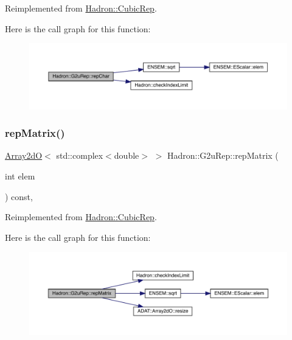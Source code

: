 Reimplemented from \mbox{\hyperlink{structHadron_1_1CubicRep_af45227106e8e715e84b0af69cd3b36f8}{Hadron\+::\+Cubic\+Rep}}.

Here is the call graph for this function\+:
\nopagebreak
\begin{figure}[H]
\begin{center}
\leavevmode
\includegraphics[width=350pt]{dc/dc0/structHadron_1_1G2uRep_a51ea6b7795e07c824b72dbefb7fb6ddb_cgraph}
\end{center}
\end{figure}
\mbox{\label{structHadron_1_1G2uRep_ac35dd43af2c4b6f32d9d3511b2500230}} 
\subsubsection{\texorpdfstring{repMatrix()}{repMatrix()}\hspace{0.1cm}{\footnotesize\ttfamily [1/3]}}
{\footnotesize\ttfamily \mbox{\hyperlink{classADAT_1_1Array2dO}{Array2dO}}$<$ std\+::complex$<$double$>$ $>$ Hadron\+::\+G2u\+Rep\+::rep\+Matrix (\begin{DoxyParamCaption}\item[{int}]{elem }\end{DoxyParamCaption}) const\hspace{0.3cm}{\ttfamily [inline]}, {\ttfamily [virtual]}}



Reimplemented from \mbox{\hyperlink{structHadron_1_1CubicRep_ac5d7e9e6f4ab1158b5fce3e4ad9e8005}{Hadron\+::\+Cubic\+Rep}}.

Here is the call graph for this function\+:
\nopagebreak
\begin{figure}[H]
\begin{center}
\leavevmode
\includegraphics[width=350pt]{dc/dc0/structHadron_1_1G2uRep_ac35dd43af2c4b6f32d9d3511b2500230_cgraph}
\end{center}
\end{figure}
\mbox{\label{structHadron_1_1G2uRep_ac35dd43af2c4b6f32d9d3511b2500230}} 
